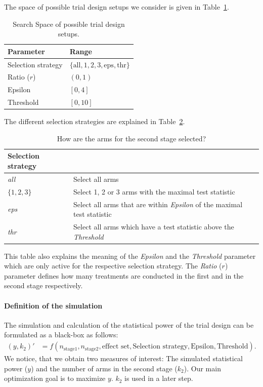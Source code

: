 \documentclass[bimj,fleqn]{w-art}
\theoremstyle{plain}
\theoremstyle{definition}
\begin{document}
The space of possible trial design setups we consider is given in Table~\ref{tab:search_space}.
\begin{table}[h]
  \caption{Search Space of possible trial design setups.}
  \label{tab:search_space}
  \centering
  \begin{tabular}{ll}
  \hline
  Parameter          & Range \\
  \hline
  Selection strategy & $\{\text{all}, 1, 2, 3, \text{eps}, \text{thr} \}$ \\
  Ratio ($r$)        & $(0,1)$ \\
  Epsilon            & $[0,4]$ \\
  Threshold          & $[0,10]$ \\
  \hline
  \end{tabular}
\end{table}
The different selection strategies are explained in Table~\ref{tab:selection_strategies}.
\begin{table}[h]
  \caption{How are the arms for the second stage selected?}
  \label{tab:selection_strategies}
  \centering
  \begin{tabular}{ll}
  \hline
  Selection strategy &  \\
  \hline
  \emph{all}     & Select all arms  \\
  $\{1,2,3\}$    & Select 1, 2 or 3 arms with the maximal test statistic \\
  \emph{eps}     & Select all arms that are within \emph{Epsilon} of the maximal test statistic \\
  \emph{thr}     & Select all arms which have a test statistic above the \emph{Threshold} \\
  \hline
  \end{tabular}
\end{table}
This table also explains the meaning of the \emph{Epsilon} and the \emph{Threshold} parameter which are only active for the respective selection strategy.
The \emph{Ratio} ($r$) parameter defines how many treatments are conducted in the first and in the second stage respectively.

\paragraph{Definition of the simulation}
The simulation and calculation of the statistical power of the trial design can be formulated as a black-box as follows:
\begin{align}
  \label{eq:bbox}
  (y,k_2)' &= f(n_{\text{stage1}}, n_{\text{stage2}}, \text{effect set}, \text{Selection strategy}, \text{Epsilon}, \text{Threshold}).
\end{align}
We notice, that we obtain two measures of interest: The simulated statistical power ($y$) and the number of arms in the second stage ($k_2$).
Our main optimization goal is to maximize $y$.
$k_2$ is used in a later step.
\end{document}
